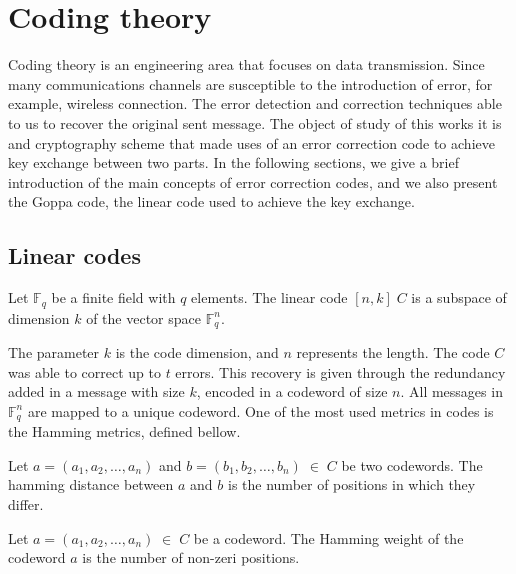 \section{Coding theory}
Coding theory is an engineering area that focuses on data transmission. Since many communications channels are susceptible to the introduction of error, for example, wireless connection. The error detection and correction techniques able to us to recover the original sent message. The object of study of this works it is and cryptography scheme that made uses of an error correction code to achieve key exchange between two parts. In the following sections, we give a brief introduction of the main concepts of error correction codes, and we also present the Goppa code, the linear code used to achieve the key exchange.


\subsection{Linear codes}
\begin{definition}
Let $\mathbb{F}_{q}$ be a finite field with $q$ elements. The linear code $[n, k]\;C$ is a subspace of dimension $k$ of the vector space $\mathbb{F}_{q}^n$.
\end{definition}

The parameter $k$ is the code dimension, and $n$ represents the length. The code $C$ was able to correct up to $t$ errors. This recovery is given through the redundancy added in a message with size $k$, encoded in a codeword of size $n$. All messages in $\mathbb{F}_{q}^n$ are mapped to a unique codeword. One of the most used metrics in codes is the Hamming metrics, defined bellow.

\begin{definition}
Let $a = (a_1, a_2, \dots, a_n)$ and $b = (b_1, b_2, \dots, b_n) \; \in \; C$ be two codewords. The hamming distance between $a$ and $b$ is the number of positions in which they differ.
\end{definition}

\begin{definition}
Let $a = (a_1, a_2, \dots, a_n) \; \in \; C$ be a codeword. The Hamming weight of the codeword $a$ is the number of non-zeri positions.
\end{definition}


